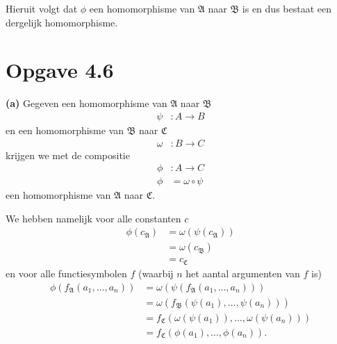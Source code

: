 \documentclass[a4paper,11pt]{article}
\begin{document}
Hieruit volgt dat $\phi$ een homomorphisme van $\mathfrak{A}$ naar
$\mathfrak{B}$ is en dus bestaat een dergelijk homomorphisme.


\section*{Opgave 4.6}

\begin{description}

\item{\bf (a)} %
Gegeven een homomorphisme van $\mathfrak{A}$ naar $\mathfrak{B}$
\begin{align*}
\psi &: A \rightarrow B
\end{align*}
en een homomorphisme van $\mathfrak{B}$ naar $\mathfrak{C}$
\begin{align*}
\omega &: B \rightarrow C
\end{align*}
krijgen we met de compositie
\begin{align*}
\phi &: A \rightarrow C \\
\phi &= \omega \circ \psi
\end{align*}
een homomorphisme van $\mathfrak{A}$ naar $\mathfrak{C}$.

We hebben namelijk voor alle constanten $c$
\begin{align*}
\phi(c_{\mathfrak{A}}) &= \omega(\psi(c_{\mathfrak{A}})) \\
                       &= \omega(c_{\mathfrak{B}}) \\
                       &= c_{\mathfrak{C}}
\end{align*}
en voor alle functiesymbolen $f$ (waarbij $n$ het aantal argumenten van $f$
is)
\begin{align*}
\phi(f_{\mathfrak{A}}(a_{1}, \ldots, a_{n})) &=
                                             \omega(\psi(f_{\mathfrak{A}}(a_{1},
                                             \ldots, a_{n}))) \\
                                             &=
                                             \omega(f_{\mathfrak{B}}(\psi(a_{1}),
                                             \ldots, \psi(a_{n}))) \\
                                             &=
                                             f_{\mathfrak{C}}(\omega(\psi(a_{1})),
                                             \ldots, \omega(\psi(a_{n}))) \\
                                             &=
                                             f_{\mathfrak{C}}(\phi(a_{1}),
                                             \ldots, \phi(a_{n})).
\end{align*}


\end{description}
\end{document}
